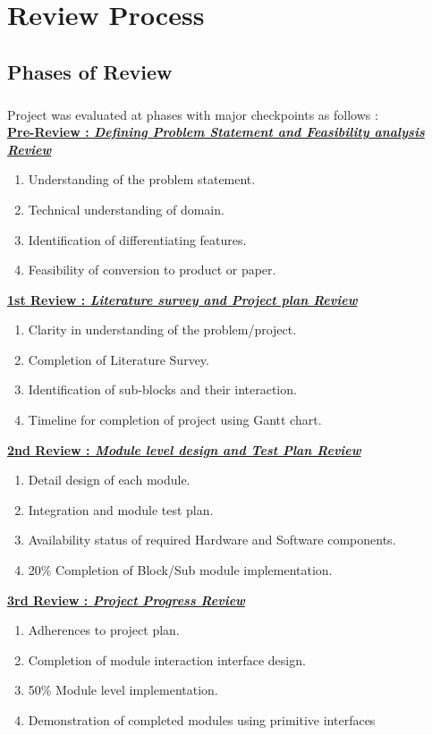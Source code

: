 \appendix
\chapter{Review Process}
\section{Phases of Review}
\paragraph{} Project was evaluated at phases with major checkpoints as follows :\\

\textbf {\underline{Pre-Review :  \textit{Defining Problem Statement and Feasibility analysis Review}}}
\begin{enumerate}
\item Understanding of the problem statement.  
\item Technical understanding of domain. 
\item Identification of differentiating features.
\item Feasibility of conversion to product or paper.
\end{enumerate}

\textbf {\underline{1st Review :  \textit{Literature survey and Project plan Review }}}
\begin{enumerate}
\item Clarity in understanding of the problem/project. 
\item Completion of Literature Survey. 
\item Identification of sub-blocks and their interaction.
\item Timeline for completion of project using Gantt chart.
\end{enumerate}

\textbf {\underline{2nd Review :  \textit{Module level design and Test Plan Review}}}
\begin{enumerate}
\item Detail design of each module. 
\item Integration and module test plan. 
\item Availability status of required Hardware and Software components.
\item 20\% Completion of Block/Sub module implementation.
\end{enumerate}
    
\textbf {\underline{3rd Review :  \textit{Project Progress Review}}}
\begin{enumerate}
\item Adherences to project plan.
\item Completion of module interaction interface design.
\item 50\% Module level implementation.
\item Demonstration of completed modules using primitive interfaces 
\end{enumerate}

